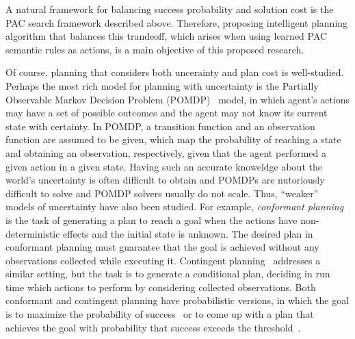 \documentclass[12pt]{article}
\newcommand{\note}[1]{\textbf{\textit{#1}}}
\begin{document}
A natural framework for balancing success probability and solution cost 
is the PAC search framework described above. 
Therefore, proposing intelligent planning algorithm that balances this trandeoff, which arises when using learned PAC semantic rules as actions, is a main objective of this proposed research. 





Of course, planning that considers both uncerainty and plan cost is well-studied. Perhaps the most rich model for planning with uncertainty is the Partially Observable Markov Decision Problem (POMDP)~\cite{cassandra1994acting}
model, in which agent's actions may have a set of possible outcomes and the agent may not know its current state with certainty. 
In POMDP, a transition function and an observation function are assumed to be given, which map the probability of reaching a state and obtaining an observation, respectively, given that the agent performed a given action in a given state. Having such an accurate knoweldge about the world's uncertainty is often difficult to obtain and POMDPs are nutoriously difficult to solve and POMDP solvers usually do not scale. %
Thus, ``weaker'' models of uncertainty have also been studied. 
For example, {\em conformant planning}~\cite{hoffmann2006conformant,cimatti2004conformant,cimatti1999conformant} is the task of generating a plan to reach a goal when the actions have non-deterministic effects
and the initial state is unknown. The desired plan in conformant planning must guarantee that the goal is achieved without any observations collected while executing it. Contingent planning~\cite{hoffmann2005contingent,majercik2003contingent} addresses a similar setting, but the task is to generate a conditional plan, deciding in run time which actions to perform by considering collected observations. 
Both conformant and contingent planning have probabilistic versions,
in which the goal is to maximize the probability of success~\cite{blum1999probabilistic,taig2015compilation,markou2016cost} 
or to come up with a plan that achieves the goal with probability that success exceeds the threshold~\cite{kushmerick1995algorithm}.
\end{document}
